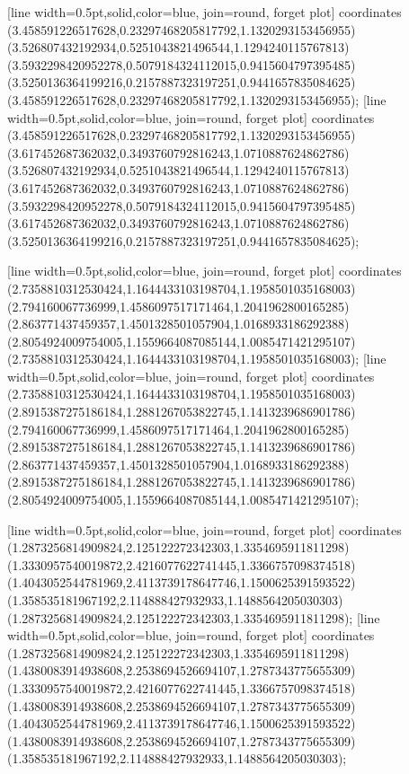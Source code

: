 [line width=0.5pt,solid,color=blue, join=round, forget plot] coordinates {(3.458591226517628,0.23297468205817792,1.1320293153456955) (3.526807432192934,0.5251043821496544,1.1294240115767813) (3.5932298420952278,0.5079184324112015,0.9415604797395485) (3.5250136364199216,0.2157887323197251,0.9441657835084625) (3.458591226517628,0.23297468205817792,1.1320293153456955)};
[line width=0.5pt,solid,color=blue, join=round, forget plot] coordinates {(3.458591226517628,0.23297468205817792,1.1320293153456955) (3.617452687362032,0.3493760792816243,1.0710887624862786) (3.526807432192934,0.5251043821496544,1.1294240115767813) (3.617452687362032,0.3493760792816243,1.0710887624862786) (3.5932298420952278,0.5079184324112015,0.9415604797395485) (3.617452687362032,0.3493760792816243,1.0710887624862786) (3.5250136364199216,0.2157887323197251,0.9441657835084625)};

[line width=0.5pt,solid,color=blue, join=round, forget plot] coordinates {(2.7358810312530424,1.1644433103198704,1.1958501035168003) (2.794160067736999,1.4586097517171464,1.2041962800165285) (2.863771437459357,1.4501328501057904,1.0168933186292388) (2.8054924009754005,1.1559664087085144,1.0085471421295107) (2.7358810312530424,1.1644433103198704,1.1958501035168003)};
[line width=0.5pt,solid,color=blue, join=round, forget plot] coordinates {(2.7358810312530424,1.1644433103198704,1.1958501035168003) (2.8915387275186184,1.2881267053822745,1.1413239686901786) (2.794160067736999,1.4586097517171464,1.2041962800165285) (2.8915387275186184,1.2881267053822745,1.1413239686901786) (2.863771437459357,1.4501328501057904,1.0168933186292388) (2.8915387275186184,1.2881267053822745,1.1413239686901786) (2.8054924009754005,1.1559664087085144,1.0085471421295107)};

[line width=0.5pt,solid,color=blue, join=round, forget plot] coordinates {(1.2873256814909824,2.125122272342303,1.3354695911811298) (1.3330957540019872,2.4216077622741445,1.3366757098374518) (1.4043052544781969,2.4113739178647746,1.1500625391593522) (1.358535181967192,2.114888427932933,1.1488564205030303) (1.2873256814909824,2.125122272342303,1.3354695911811298)};
[line width=0.5pt,solid,color=blue, join=round, forget plot] coordinates {(1.2873256814909824,2.125122272342303,1.3354695911811298) (1.4380083914938608,2.2538694526694107,1.2787343775655309) (1.3330957540019872,2.4216077622741445,1.3366757098374518) (1.4380083914938608,2.2538694526694107,1.2787343775655309) (1.4043052544781969,2.4113739178647746,1.1500625391593522) (1.4380083914938608,2.2538694526694107,1.2787343775655309) (1.358535181967192,2.114888427932933,1.1488564205030303)};

